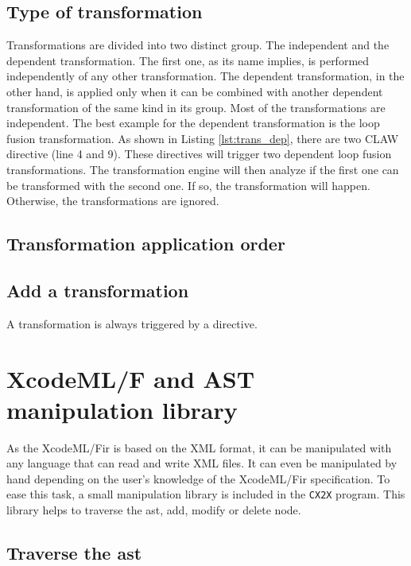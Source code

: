 \documentclass[a4paper, 11pt]{report}
\def\xcodeml{XcodeML/F\xspace}
\def\cx2x{\lstinline!CX2X!\xspace}
\begin{document}
\section{Type of transformation}
Transformations are divided into two distinct group. The independent and the dependent transformation. The first one, as its name implies, is performed independently of any other transformation. The dependent transformation, in the other hand, is applied only when it can be combined with another dependent transformation of the same kind in its group. Most of the transformations are independent. The best example for the dependent transformation is the loop fusion transformation. As shown in Listing \ref{lst:trans_dep}, there are two CLAW directive (line 4 and 9). These directives will trigger two dependent loop fusion transformations. The transformation engine will then analyze if the first one can be transformed with the second one. If so, the transformation will happen. Otherwise, the transformations are ignored.



\section{Transformation application order}

\section{Add a transformation}
A transformation is always triggered by a directive. 

\chapter{\xcodeml and AST manipulation library}
As the \xcodeml \gls{ir} is based on the XML format, it can be manipulated with any language that can read and write XML files. It can even be manipulated by hand depending on the user's knowledge of the \xcodeml \gls{ir} specification. 
To ease this task, a small manipulation library is included in the \cx2x program. This library helps to traverse the \gls{ast}, add, modify or delete node.

\section{Traverse the \gls{ast}}
\end{document}
